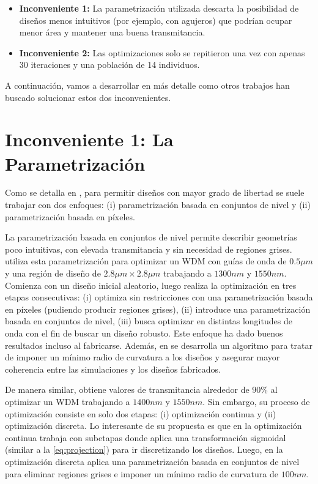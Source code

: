 \begin{itemize}
  \item \textbf{Inconveniente 1:} 
  La parametrización utilizada descarta la posibilidad de diseños menos 
  intuitivos (por ejemplo, con agujeros) que podrían ocupar menor área y mantener una buena transmitancia.
  
  \item \textbf{Inconveniente 2:}
  Las optimizaciones solo se repitieron una vez con apenas 30 iteraciones y una población de 14 individuos.

\end{itemize}


A continuación, vamos a desarrollar en más detalle como otros trabajos han buscado solucionar estos dos inconvenientes.

\section{Inconveniente 1: La Parametrización}

Como se detalla en \cite{Molesky2018}, para permitir diseños con mayor grado de libertad se suele 
trabajar con dos enfoques:
(i) parametrización basada en conjuntos de nivel y
(ii) parametrización basada en píxeles.


La parametrización basada en conjuntos de nivel permite describir geometrías poco intuitivas,
con elevada transmitancia y sin necesidad de regiones grises.
\cite{Piggott2015} utiliza esta parametrización para optimizar un WDM con guías de onda de $0.5 \mu m$
y una región de diseño de $2.8 \mu m \times 2.8 \mu m$ trabajando a $1300 nm$ y $1550 nm$.
Comienza con un diseño inicial aleatorio, luego realiza la optimización en tres etapas consecutivas:
(i) optimiza sin restricciones con una parametrización basada en píxeles (pudiendo producir regiones grises),
(ii) introduce una parametrización basada en conjuntos de nivel,
(iii) busca optimizar en distintas longitudes de onda con el fin de buscar un diseño robusto.
Este enfoque ha dado buenos resultados incluso al fabricarse. 
Además, en \cite{Piggott2017} se desarrolla
un algoritmo para tratar de imponer un mínimo radio de curvatura a los diseños y asegurar 
mayor coherencia entre las simulaciones y los diseños fabricados.

De manera similar, \cite{Su2020} obtiene valores de transmitancia alrededor de $90\%$ al
optimizar un WDM trabajando a $1400nm$ y $1550 nm$.
Sin embargo, su proceso de optimización consiste en solo dos etapas:
(i) optimización continua y
(ii) optimización discreta.
Lo interesante de su propuesta es que en la optimización continua trabaja con subetapas donde aplica
una transformación sigmoidal (similar a la \autoref{eq:projection}) para ir discretizando los diseños.
Luego, en la optimización discreta aplica una parametrización basada en conjuntos de nivel para 
eliminar regiones grises e imponer un mínimo radio de curvatura de $100 nm$.


